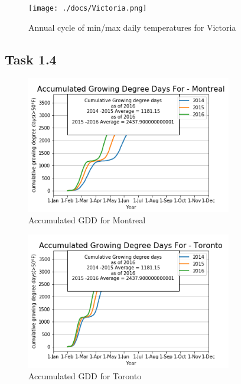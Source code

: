 \documentclass[12pt]{article}
\begin{document}
\begin{figure}[!htbp]
\centering
\texttt{[image: ./docs/Victoria.png]} 
\caption{\scriptsize Annual cycle of min/max daily temperatures for Victoria}
\label{minmax_vict}		  
\end{figure}

\pagebreak
\subsection{Task 1.4}	

\begin{figure}[!htbp]
\centering
\includegraphics[width=0.8\textwidth]{./docs/MontrealGDD.png} 
\caption{\scriptsize Accumulated GDD for Montreal}
\label{accuGDD_1}		  
\end{figure}

\begin{figure}[!htbp]
\centering
\includegraphics[width=0.8\textwidth]{./docs/TorontoGDD.png} 
\caption{\scriptsize Accumulated GDD for Toronto}
\label{accuGDD_2}		  
\end{figure}
	
\end{document}
